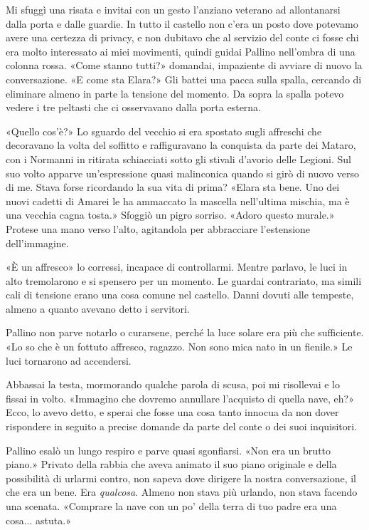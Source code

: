 Mi sfuggì una risata e invitai con un gesto l'anziano veterano ad
allontanarsi dalla porta e dalle guardie. In tutto il castello non c'era
un posto dove potevamo avere una certezza di privacy, e non dubitavo che
al servizio del conte ci fosse chi era molto interessato ai miei
movimenti, quindi guidai Pallino nell'ombra di una colonna rossa. «Come
stanno tutti?» domandai, impaziente di avviare di nuovo la
conversazione. «E come sta Elara?» Gli battei una pacca sulla spalla,
cercando di eliminare almeno in parte la tensione del momento. Da sopra
la spalla potevo vedere i tre peltasti che ci osservavano dalla porta
esterna.

«Quello cos'è?» Lo sguardo del vecchio si era spostato sugli affreschi
che decoravano la volta del soffitto e raffiguravano la conquista da
parte dei Mataro, con i Normanni in ritirata schiacciati sotto gli
stivali d'avorio delle Legioni. Sul suo volto apparve un'espressione
quasi malinconica quando si girò di nuovo verso di me. Stava forse
ricordando la sua vita di prima? «Elara sta bene. Uno dei nuovi cadetti
di Amarei le ha ammaccato la mascella nell'ultima mischia, ma è una
vecchia cagna tosta.» Sfoggiò un pigro sorriso. «Adoro questo murale.»
Protese una mano verso l'alto, agitandola per abbracciare l'estensione
dell'immagine.

«È un affresco» lo corressi, incapace di controllarmi. Mentre parlavo,
le luci in alto tremolarono e si spensero per un momento. Le guardai
contrariato, ma simili cali di tensione erano una cosa comune nel
castello. Danni dovuti alle tempeste, almeno a quanto avevano detto i
servitori.

Pallino non parve notarlo o curarsene, perché la luce solare era più che
sufficiente. «Lo so che è un fottuto affresco, ragazzo. Non sono mica
nato in un fienile.» Le luci tornarono ad accendersi.

Abbassai la testa, mormorando qualche parola di scusa, poi mi risollevai
e lo fissai in volto. «Immagino che dovremo annullare l'acquisto di
quella nave, eh?» Ecco, lo avevo detto, e sperai che fosse una cosa
tanto innocua da non dover rispondere in seguito a precise domande da
parte del conte o dei suoi inquisitori.

Pallino esalò un lungo respiro e parve quasi sgonfiarsi. «Non era un
brutto piano.» Privato della rabbia che aveva animato il suo piano
originale e della possibilità di urlarmi contro, non sapeva dove
dirigere la nostra conversazione, il che era un bene. Era
\emph{qualcosa}. Almeno non stava più urlando, non stava facendo una
scenata. «Comprare la nave con un po' della terra di tuo padre era una
cosa... astuta.»

